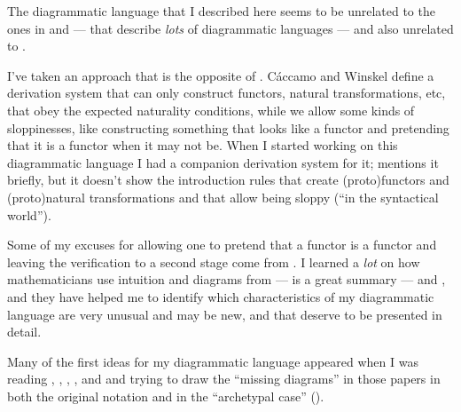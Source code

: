 \documentclass[oneside,12pt]{article}
\begin{document}
The diagrammatic language that I described here seems to be unrelated
to the ones in \cite{CoeckePQP} and \cite{CoeckeNewStruP} --- that
describe {\sl lots} of diagrammatic languages --- and also unrelated to
\cite{MarsdenCTUSD}.


I've taken an approach that is the opposite of \cite{CaccamoWinskel}.
Cáccamo and Winskel define a derivation system that can only construct
functors, natural transformations, etc, that obey the expected
naturality conditions, while we allow some kinds of sloppinesses, like
constructing something that looks like a functor and pretending that
it is a functor when it may not be. When I started working on this
diagrammatic language I had a companion derivation system for it;
\cite[Section 14]{IDARCT} mentions it briefly, but it doesn't show the
introduction rules that create (proto)functors and (proto)natural
transformations and that allow being sloppy (``in the syntactical
world'').


Some of my excuses for allowing one to pretend that a functor is a
functor and leaving the verification to a second stage come from
\cite{ChengMorally}. I learned a {\sl lot} on how mathematicians use
intuition and diagrams from \cite{Kromer} --- \cite{KromerSlides} is a
great summary --- and \cite{Corfield}, and they have helped me to
identify which characteristics of my diagrammatic language are very
unusual and may be new, and that deserve to be presented in detail.


Many of the first ideas for my diagrammatic language appeared when I
was reading \cite{SeelyBeck}, \cite{SeelyLCCC}, \cite{SeelyPLC},
\cite{Jacobs}, and \cite{SeelyDiff} and trying to draw the ``missing
diagrams'' in those papers in both the original notation and in the
``archetypal case'' (\cite[Section 16]{IDARCT}).

\end{document}
